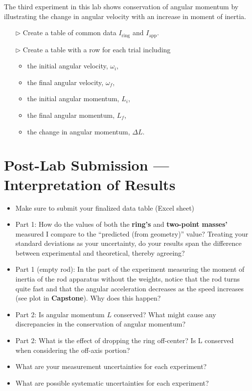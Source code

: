 The third experiment in this lab shows conservation of angular momentum by illustrating the change in angular velocity with an increase in moment of inertia.
\begin{itemize}
\item[$\triangleright$] Create a table of common data $I_{\mbox{ring}}$ and $I_{\mbox{app}}$.
\item[$\triangleright$] Create a table with a row for each trial including
  \begin{itemize}
  \item the initial angular velocity, $\omega_i$,
  \item the final angular velocity, $\omega_f$,
  \item the initial angular momentum, $L_i$,
  \item the final angular momentum, $L_f$,
  \item the change in angular momentum, $\Delta L$.
  \end{itemize}
\end{itemize}


\pagebreak

\section{Post-Lab Submission --- Interpretation of Results}

\begin{itemize}
    \item Make sure to submit your finalized data table (Excel sheet)
    \item Part 1: How do the values of both the \textbf{ring's} and \textbf{two-point masses'} measured I compare to the “predicted (from geometry)” value? Treating your standard deviations as your uncertainty, do your results span the difference between experimental and theoretical, thereby agreeing?
    \item Part 1 (empty rod): In the part of the experiment measuring the moment of inertia of the rod apparatus without the weights, notice that the rod turns quite fast and that the angular acceleration decreases as the speed increases (see plot in \textbf{Capstone}). Why does this happen?
    \item Part 2: Is angular momentum $L$ conserved? What might cause any discrepancies in the conservation of angular momentum?
    \item Part 2: What is the effect of dropping the ring off-center? Is L conserved when considering the off-axis portion?
    \item What are your measurement uncertainties for each experiment?
    \item What are possible systematic uncertainties for each experiment?
\end{itemize}





